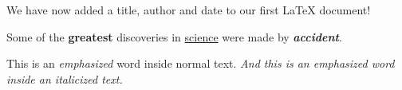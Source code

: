 




\maketitle
 
We have now added a title, author and date to our first \LaTeX{} document!

Some of the \textbf{greatest}
discoveries in \underline{science} 
were made by \textbf{\textit{accident}}.

This is an \emph{emphasized} word inside normal text. \textit{And this is an \emph{emphasized} word inside an italicized text.}

